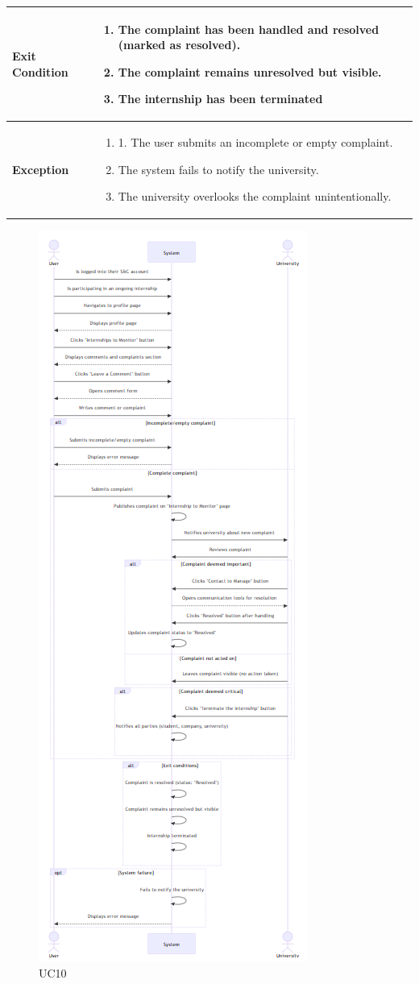 \begin{longtable}{|p{}|p{}|}
\textbf{Exit Condition} & 
\begin{enumerate}
    \item  The complaint has been handled and resolved (marked as resolved).
    \item  The complaint remains unresolved but visible.
    \item The internship has been terminated
\end{enumerate}\\
\hline
\textbf{Exception} &
\begin{enumerate}
    \item 1. The user submits an incomplete or empty complaint.
    \item  The system fails to notify the university.
    \item  The university overlooks the complaint unintentionally.
\end{enumerate}\\
\hline
\end{longtable}

\begin{figure}[H]
    \centering
    \includegraphics[width=0.55\linewidth]{RASD//Images/UC10.png}
    \caption{UC10}
\end{figure}

